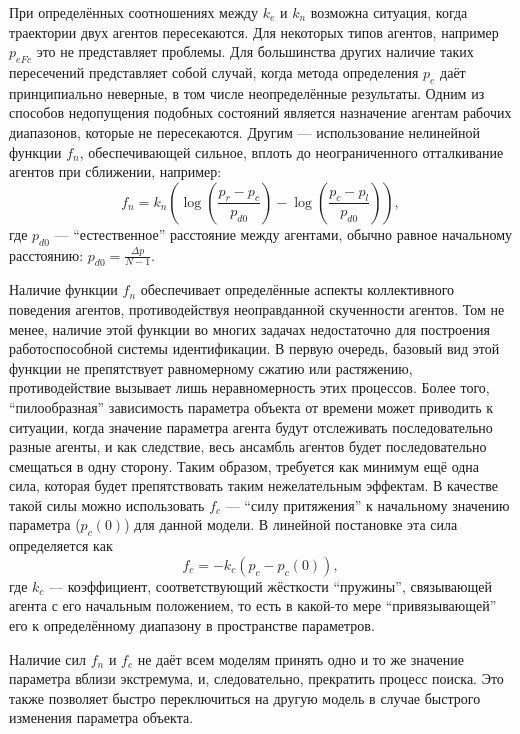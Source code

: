 При определённых соотношениях между $k_e$ и $k_n$
возможна ситуация, когда траектории двух агентов пересекаются.
Для некоторых типов агентов, например $p_{eFc}$
это не представляет проблемы. Для большинства других
наличие таких пересечений представляет собой случай,
когда метода определения $p_e$ даёт принципиально
неверные, в том числе неопределённые результаты.
Одним из способов недопущения подобных состояний
является назначение агентам рабочих диапазонов, которые не пересекаются.
Другим --- использование нелинейной функции $f_n$,
обеспечивающей сильное, вплоть до неограниченного отталкивание
агентов при сближении, например:
%
%
\begin{equation}
  f_n = k_n \left( \log\left( \frac{p_r-p_c}{p_{d0}} \right) -  \log\left( \frac{p_c-p_l}{p_{d0}}\right) \right),
  \label{atu:eq:f_n_log}
\end{equation}
%
где
$p_{d0}$ --- ``естественное'' расстояние между агентами, обычно равное начальному расстоянию:
$p_{d0} = \frac{\Delta p}{N-1}$.





Наличие функции $f_n$ обеспечивает определённые аспекты
коллективного поведения агентов, противодействуя неоправданной
скученности агентов. Том не менее, наличие этой функции во многих задачах
недостаточно для построения работоспособной системы идентификации.
В первую очередь, базовый вид этой функции не препятствует равномерному
сжатию или растяжению, противодействие вызывает лишь неравномерность этих процессов.
Более того, ``пилообразная'' зависимость параметра объекта от времени
может приводить к ситуации, когда  значение параметра агента будут
отслеживать последовательно разные агенты, и как следствие,
весь ансамбль агентов будет
последовательно смещаться в одну сторону.
Таким образом, требуется как минимум ещё одна сила,
которая будет препятствовать таким нежелательным эффектам.
В качестве такой силы можно использовать
$f_c$  --- ``силу притяжения'' к начальному значению
параметра ($p_{c}(0)$)
для данной модели. В линейной постановке эта сила определяется как
%
\begin{equation}
  f_c = -k_c (p_c - p_{c}(0)) ,
  \label{atu:eq:f_c}
\end{equation}
%
где $k_c$ --- коэффициент, соответствующий жёсткости ``пружины'',
связывающей агента с его начальным положением, то есть в какой-то
мере ``привязывающей'' его к определённому диапазону
в пространстве параметров.

Наличие сил $f_n$ и $f_c$ не даёт всем моделям принять одно
и то же значение параметра вблизи экстремума, и, следовательно,
прекратить процесс поиска. Это также позволяет быстро переключиться
на другую модель в случае быстрого изменения параметра объекта.

